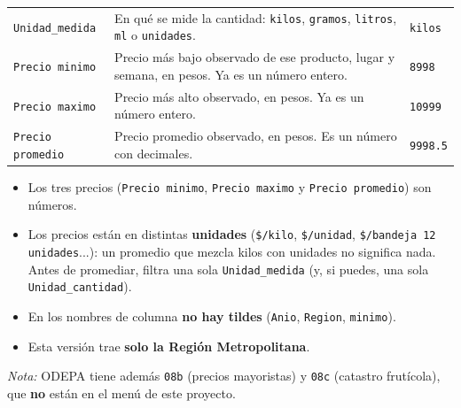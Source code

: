 \documentclass[10.5pt]{article}
\begin{document}
\begin{xltabular}{\linewidth}{@{}p{4.5cm} >{\raggedright\arraybackslash}X p{3.4cm}@{}}
\texttt{Unidad\_\allowbreak{}medida} & En qué se mide la cantidad: \texttt{kilos}, \texttt{gramos}, \texttt{litros}, \texttt{ml} o \texttt{unidades}. & \texttt{kilos} \\
\texttt{Precio minimo} & Precio más bajo observado de ese producto, lugar y semana, en pesos. Ya es un número entero. & \texttt{8998} \\
\texttt{Precio maximo} & Precio más alto observado, en pesos. Ya es un número entero. & \texttt{10999} \\
\texttt{Precio promedio} & Precio promedio observado, en pesos. Es un número con decimales. & \texttt{9998.5} \\
\end{xltabular}

\begin{alertabox}
\begin{itemize}[leftmargin=1.1em,itemsep=2pt,topsep=2pt]
\item Los tres precios (\texttt{Precio minimo}, \texttt{Precio maximo} y \texttt{Precio promedio}) son números.
\item Los precios están en distintas \textbf{unidades} (\texttt{\$/\allowbreak{}kilo}, \texttt{\$/\allowbreak{}unidad}, \texttt{\$/\allowbreak{}bandeja 12 unidades}...): un promedio que mezcla kilos con unidades no significa nada. Antes de promediar, filtra una sola \texttt{Unidad\_\allowbreak{}medida} (y, si puedes, una sola \texttt{Unidad\_\allowbreak{}cantidad}).
\item En los nombres de columna \textbf{no hay tildes} (\texttt{Anio}, \texttt{Region}, \texttt{minimo}).
\item Esta versión trae \textbf{solo la Región Metropolitana}.
\end{itemize}
\end{alertabox}
\vspace{4pt}
{\small \emph{Nota:} ODEPA tiene además \texttt{08b} (precios mayoristas) y \texttt{08c} (catastro frutícola), que \textbf{no} están en el menú de este proyecto.}


\newpage
{}\label{base9a}\hypertarget{base9a}{}
\end{document}
